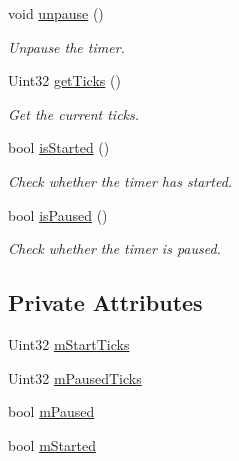 \begin{DoxyCompactItemize}
\mbox{\label{class_l_timer_a67a946bffb25cf5eb8ab430ffb5f7cec}} 
void \mbox{\hyperlink{class_l_timer_a67a946bffb25cf5eb8ab430ffb5f7cec}{unpause}} ()
\begin{DoxyCompactList}\small\item\em Unpause the timer. \end{DoxyCompactList}\item 
\mbox{\label{class_l_timer_a57c4bdca0f7bdd75c65b6ab1499de1e7}} 
Uint32 \mbox{\hyperlink{class_l_timer_a57c4bdca0f7bdd75c65b6ab1499de1e7}{get\+Ticks}} ()
\begin{DoxyCompactList}\small\item\em Get the current ticks. \end{DoxyCompactList}\item 
\mbox{\label{class_l_timer_a102ca688eaa4109dd733b4b60a29d27c}} 
bool \mbox{\hyperlink{class_l_timer_a102ca688eaa4109dd733b4b60a29d27c}{is\+Started}} ()
\begin{DoxyCompactList}\small\item\em Check whether the timer has started. \end{DoxyCompactList}\item 
\mbox{\label{class_l_timer_ae1d9b504da6ed0f42e10f2338a9f88bb}} 
bool \mbox{\hyperlink{class_l_timer_ae1d9b504da6ed0f42e10f2338a9f88bb}{is\+Paused}} ()
\begin{DoxyCompactList}\small\item\em Check whether the timer is paused. \end{DoxyCompactList}\end{DoxyCompactItemize}
\subsection*{Private Attributes}
\begin{DoxyCompactItemize}
\item 
Uint32 \mbox{\hyperlink{class_l_timer_a1a1f0eeba488175958e91a6eed5483e7}{m\+Start\+Ticks}}
\item 
Uint32 \mbox{\hyperlink{class_l_timer_ac644044e1a79f57f7b657f7bc0325745}{m\+Paused\+Ticks}}
\item 
bool \mbox{\hyperlink{class_l_timer_aa97249c76c90700dc88ed648cdf87812}{m\+Paused}}
\item 
bool \mbox{\hyperlink{class_l_timer_adebab1cd99709109d8a259369458eaf7}{m\+Started}}
\end{DoxyCompactItemize}


